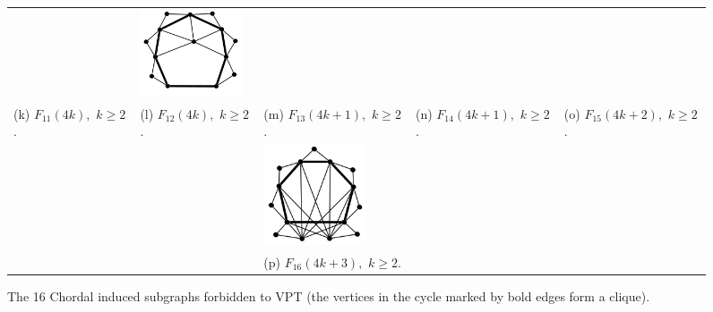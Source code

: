 \begin{figure}[htb]
\begin{tabular}{  p{2.7cm} p{2.7cm} p{2.7cm} p{2.7cm} p{2.7cm} }
    & 
    \includegraphics[width=3cm]{img/f15.png} 
    \\ %
    \footnotesize 
    (k)  \footnotesize  $F_{11}(4k),$ $k\geq2$. 
    & 
    \footnotesize (l)  $F_{12}(4k),$ $k\geq2$.
    & 
    \footnotesize (m)  $F_{13}(4k+1),$ $k\geq2$.
    & 
    \footnotesize (n)  $F_{14}(4k+1),$ $k\geq2$.
    & 
    \footnotesize (o)  $F_{15}(4k+2),$ $k\geq2$.
    
    \\ %
    
    && \includegraphics[width=3cm]{img/f16.png} &&
    
    \\%
    
    && \footnotesize (p)  $F_{16}(4k+3),$ $k\geq2$. &&
    
  \end{tabular}
 \caption{The 16 Chordal induced subgraphs forbidden to VPT (the vertices in the cycle marked by bold edges form a clique).}
 \label{fig:16proibidos}
\end{figure}  
 
